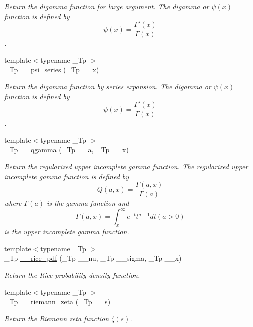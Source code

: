 \begin{DoxyCompactItemize}
\begin{DoxyCompactList}\small\item\em Return the digamma function for large argument. The digamma or $ \psi(x) $ function is defined by \[ \psi(x) = \frac{\Gamma'(x)}{\Gamma(x)} \]. \end{DoxyCompactList}\item 
{\footnotesize template$<$typename \+\_\+\+Tp $>$ }\\\+\_\+\+Tp \hyperlink{namespacestd_1_1____detail_a378e78e1c3c08b8f146acf32a26e831a}{\+\_\+\+\_\+psi\+\_\+series} (\+\_\+\+Tp \+\_\+\+\_\+x)
\begin{DoxyCompactList}\small\item\em Return the digamma function by series expansion. The digamma or $ \psi(x) $ function is defined by \[ \psi(x) = \frac{\Gamma'(x)}{\Gamma(x)} \]. \end{DoxyCompactList}\item 
{\footnotesize template$<$typename \+\_\+\+Tp $>$ }\\\+\_\+\+Tp \hyperlink{namespacestd_1_1____detail_acaac94504608c15edb7d96884ac1dc23}{\+\_\+\+\_\+qgamma} (\+\_\+\+Tp \+\_\+\+\_\+a, \+\_\+\+Tp \+\_\+\+\_\+x)
\begin{DoxyCompactList}\small\item\em Return the regularized upper incomplete gamma function. The regularized upper incomplete gamma function is defined by \[ Q(a,x) = \frac{\Gamma(a,x)}{\Gamma(a)} \] where $ \Gamma(a) $ is the gamma function and \[ \Gamma(a,x) = \int_x^\infty e^{-t}t^{a-1}dt (a > 0) \] is the upper incomplete gamma function. \end{DoxyCompactList}\item 
{\footnotesize template$<$typename \+\_\+\+Tp $>$ }\\\+\_\+\+Tp \hyperlink{namespacestd_1_1____detail_a571f37fdf793a91985073a58a873e731}{\+\_\+\+\_\+rice\+\_\+pdf} (\+\_\+\+Tp \+\_\+\+\_\+nu, \+\_\+\+Tp \+\_\+\+\_\+sigma, \+\_\+\+Tp \+\_\+\+\_\+x)
\begin{DoxyCompactList}\small\item\em Return the Rice probability density function. \end{DoxyCompactList}\item 
{\footnotesize template$<$typename \+\_\+\+Tp $>$ }\\\+\_\+\+Tp \hyperlink{namespacestd_1_1____detail_a2be77d9bdd1b8b463be44a0e7558bc2a}{\+\_\+\+\_\+riemann\+\_\+zeta} (\+\_\+\+Tp \+\_\+\+\_\+s)
\begin{DoxyCompactList}\small\item\em Return the Riemann zeta function $ \zeta(s) $. \end{DoxyCompactList}\item 

\end{DoxyCompactItemize}
